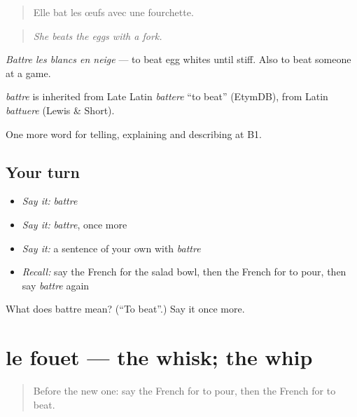 \begin{quote}
Elle bat les œufs avec une fourchette.
\end{quote}

\begin{quote}
\emph{She beats the eggs with a fork.}
\end{quote}

\emph{Battre les blancs en neige} — to beat egg whites until stiff. Also to beat someone at a game.

\begin{cousinweb}
\emph{battre} is inherited from Late Latin \emph{battere} \textquotedblleft{}to beat\textquotedblright{} (EtymDB), from Latin \emph{battuere} (Lewis \& Short).
\end{cousinweb}

\begin{grammarlens}[title={What you've built}]
One more word for telling, explaining and describing at B1.
\end{grammarlens}

\subsection*{Your turn}
\begin{itemize}
\raggedright
  \item \emph{Say it:} \emph{battre}
  \item \emph{Say it:} \emph{battre}, once more
  \item \emph{Say it:} a sentence of your own with \emph{battre}
  \item \emph{Recall:} say the French for the salad bowl, then the French for to pour, then say \emph{battre} again
\end{itemize}

\begin{tcolorbox}[breakable,colback=teal!4,colframe=teal!35!black,title={Before you move on}]
What does battre mean? (\textquotedblleft{}To beat\textquotedblright{}.) Say it once more.
\end{tcolorbox}
\section[le fouet]{le fouet — the whisk; the whip}

\label{lesson:FR-C329-fouet}



\begin{quote}
Before the new one: say the French for to pour, then the French for to beat.
\end{quote}


